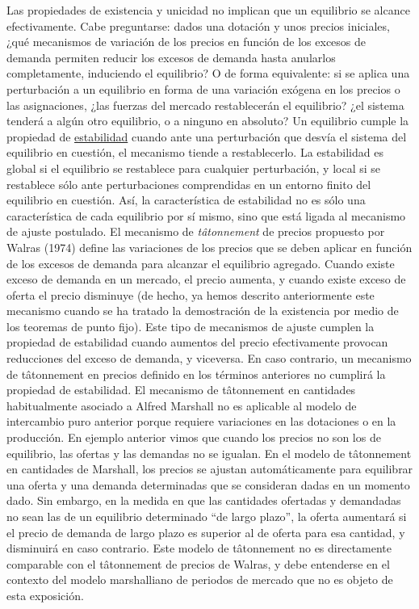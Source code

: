 \documentclass{nuevotema}
\begin{document}
Las propiedades de existencia y unicidad no implican que un equilibrio se alcance efectivamente. Cabe preguntarse: dados una dotación y unos precios iniciales, ¿qué mecanismos de variación de los precios en función de los excesos de demanda permiten reducir los excesos de demanda hasta anularlos completamente, induciendo el equilibrio? O de forma equivalente: si se aplica una perturbación a un equilibrio en forma de una variación exógena en los precios o las asignaciones, ¿las fuerzas del mercado restablecerán el equilibrio? ¿el sistema tenderá a algún otro equilibrio, o a ninguno en absoluto? Un equilibrio cumple la propiedad de \underline{estabilidad} cuando ante una perturbación que desvía el sistema del equilibrio en cuestión, el mecanismo tiende a restablecerlo. La estabilidad es global si el equilibrio se restablece para cualquier perturbación, y local si se restablece sólo ante perturbaciones comprendidas en un entorno finito del equilibrio en cuestión. Así, la característica de estabilidad no es sólo una característica de cada equilibrio por sí mismo, sino que está ligada al mecanismo de ajuste postulado. El mecanismo de \textit{tâtonnement} de precios propuesto por Walras (1974) define las variaciones de los precios que se deben aplicar en función de los excesos de demanda para alcanzar el equilibrio agregado. Cuando existe exceso de demanda en un mercado, el precio aumenta, y cuando existe exceso de oferta el precio disminuye (de hecho, ya hemos descrito anteriormente este mecanismo cuando se ha tratado la demostración de la existencia por medio de los teoremas de punto fijo). Este tipo de mecanismos de ajuste cumplen la propiedad de estabilidad cuando aumentos del precio efectivamente provocan reducciones del exceso de demanda, y viceversa. En caso contrario, un mecanismo de tâtonnement en precios definido en los términos anteriores no cumplirá la propiedad de estabilidad. El mecanismo de tâtonnement en cantidades habitualmente asociado a Alfred Marshall no es aplicable al modelo de intercambio puro anterior porque requiere variaciones en las dotaciones o en la producción. En ejemplo anterior vimos que cuando los precios no son los de equilibrio, las ofertas y las demandas no se igualan. En el modelo de tâtonnement en cantidades de Marshall, los precios se ajustan automáticamente para equilibrar una oferta y una demanda determinadas que se consideran dadas en un momento dado. Sin embargo, en la medida en que las cantidades ofertadas y demandadas no sean las de un equilibrio determinado ``de largo plazo'', la oferta aumentará si el precio de demanda de largo plazo es superior al de oferta para esa cantidad, y disminuirá en caso contrario. Este modelo de tâtonnement no es directamente comparable con el tâtonnement de precios de Walras, y debe entenderse en el contexto del modelo marshalliano de periodos de mercado que no es objeto de esta exposición. 
\end{document}
